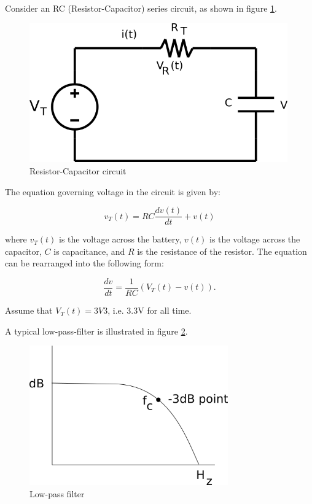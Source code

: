 \documentclass[a4paper,10pt]{article}
\begin{document}
Consider an RC (Resistor-Capacitor) series circuit, as shown in figure \ref{fig:cap}.


\begin{figure}
	\centering
	\includegraphics[height=6cm]{cap.png}
	\caption{Resistor-Capacitor circuit}
	\label{fig:cap}
\end{figure}

The equation governing voltage in the circuit is given by:

\begin{equation}
	v_T(t) = R C \frac{dv(t)}{dt} + v(t)
\end{equation}

where $v_T(t)$ is the voltage across the battery, $v(t)$ is the voltage across
the capacitor, $C$ is capacitance, and $R$ is the resistance of the resistor. 
The equation can be rearranged into the following form:

\begin{equation}
	\frac{dv}{dt} = \frac{1}{RC} (V_T(t) - v(t)).
\end{equation}

Assume that $V_T(t) = 3V3$, i.e. 3.3V for all time.

A typical low-pass-filter is illustrated in figure \ref{fig:lpf}.

\begin{figure}
	\centering
	\includegraphics[height=6cm]{lpf.png}
	\caption{Low-pass filter}
	\label{fig:lpf}
\end{figure}
\end{document}
